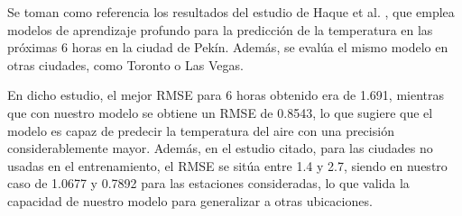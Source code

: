 Se toman como referencia los resultados del estudio de Haque et al. \cite{haque2021}, que emplea modelos de aprendizaje profundo para la predicción de la temperatura 
en las próximas 6 horas en la ciudad de Pekín. Además, se evalúa el mismo modelo en otras ciudades, como Toronto o Las Vegas. 

En dicho estudio, el mejor RMSE para 6 horas obtenido era de 1.691, mientras que con nuestro modelo se obtiene un RMSE de 0.8543, lo que sugiere que el modelo es capaz de predecir la temperatura del aire con una precisión considerablemente mayor. 
Además, en el estudio citado, para las ciudades no usadas en el entrenamiento, el RMSE se sitúa entre 1.4 y 2.7, siendo en nuestro caso de 1.0677 y 0.7892 para las estaciones consideradas,
lo que valida la capacidad de nuestro modelo para generalizar a otras ubicaciones.
